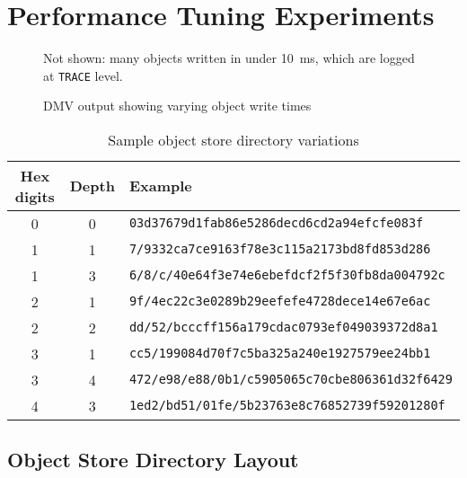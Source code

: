 \chapter{Performance Tuning Experiments}
\label{perf-tuning-exp-chapter}


\begin{figure}[p]
    \caption{DMV output showing varying object write times}
    \label{write-times-log-output}
    \centering

    Not shown: many objects written in under \SI{10}{\ms}, which are logged at
    \lstinline{TRACE} level.

\end{figure}

\begin{table}[p]
    \caption{Sample object store directory variations}
    \label{sample-directory-scheme-variations}
    \centering
    \begin{tabular}{c c l}
        Hex digits & Depth & Example \\
        \midrule
        0 & 0 & \lstinline{03d37679d1fab86e5286decd6cd2a94efcfe083f} \\
        1 & 1 & \lstinline{7/9332ca7ce9163f78e3c115a2173bd8fd853d286} \\
        1 & 3 & \lstinline{6/8/c/40e64f3e74e6ebefdcf2f5f30fb8da004792c} \\
        2 & 1 & \lstinline{9f/4ec22c3e0289b29eefefe4728dece14e67e6ac} \\
        2 & 2 & \lstinline{dd/52/bcccff156a179cdac0793ef049039372d8a1} \\
        3 & 1 & \lstinline{cc5/199084d70f7c5ba325a240e1927579ee24bb1} \\
        3 & 4 & \lstinline{472/e98/e88/0b1/c5905065c70cbe806361d32f6429} \\
        4 & 3 & \lstinline{1ed2/bd51/01fe/5b23763e8c76852739f59201280f} \\
    \end{tabular}
\end{table}

\section{Object Store Directory Layout}
\label{dir-experiment}

